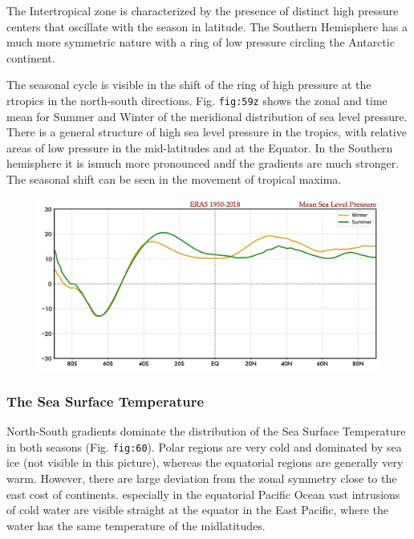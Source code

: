 The Intertropical zone is characterized by the presence of distinct high
pressure centers that oscillate with the season in latitude. The
Southern Hemisphere has a much more symmetric nature with a ring of low
pressure circling the Antarctic continent.

The seasonal cycle is visible in the shift of the ring of high pressure
at the rtropics in the north-south directions. Fig. \texttt{fig:59z}
shows the zonal and time mean for Summer and Winter of the meridional
distribution of sea level pressure. There is a general structure of high
sea level pressure in the tropics, with relative areas of low pressure
in the mid-latitudes and at the Equator. In the Southern hemisphere it
is ismuch more pronounced andf the gradients are much stronger. The
seasonal shift can be seen in the movement of tropical maxima.

\begin{figure}
\centering
\includegraphics[width = .7 \textwidth]{figs/GD/MSLZONALLDJF.png}
\caption{}\label{}
\end{figure}

\subsubsection{The Sea Surface
Temperature}\label{the-sea-surface-temperature}

North-South gradients dominate the distribution of the Sea Surface
Temperature in both seasons (Fig. \texttt{fig:60}). Polar regions are
very cold and dominated by sea ice (not visible in this picture),
whereas the equatorial regions are generally very warm. However, there
are large deviation from the zonal symmetry close to the east cost of
continents. especially in the equatorial Pacific Ocean vast intrusions
of cold water are visible straight at the equator in the East Pacific,
where the water has the same temperature of the midlatitudes.


